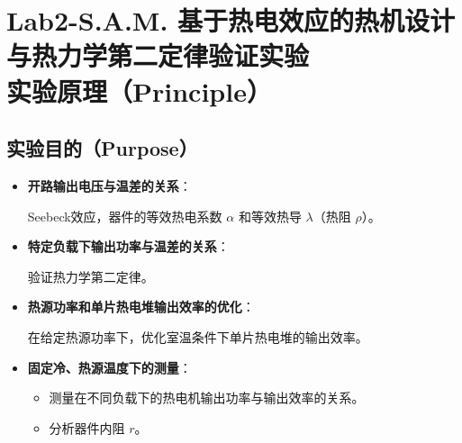 \documentclass[dvipsnames, svgnames,a4paper,11pt]{article}
\begin{document}
	
	
	\clearpage
	\tableofcontents
	\clearpage
	
	
	
	
	\setcounter{section}{0}
	\section{Lab2-S.A.M. 基于热电效应的热机设计与热力学第二定律验证实验\\ \quad\heiti 实验原理（Principle）}
	
	\subsection{实验目的（Purpose）}
	\begin{itemize}
		\item \textbf{开路输出电压与温差的关系}：
		
		Seebeck效应，器件的等效热电系数 $\alpha$ 和等效热导 $\lambda$（热阻 $\rho$）。
		
		\item \textbf{特定负载下输出功率与温差的关系}：
		
		验证热力学第二定律。
		
		\item \textbf{热源功率和单片热电堆输出效率的优化}：
		
		在给定热源功率下，优化室温条件下单片热电堆的输出效率。
		
		\item \textbf{固定冷、热源温度下的测量}：
		\begin{itemize}
			\item 测量在不同负载下的热电机输出功率与输出效率的关系。
			\item 分析器件内阻 $r$。
		\end{itemize}
	\end{itemize}
	
\end{document}
